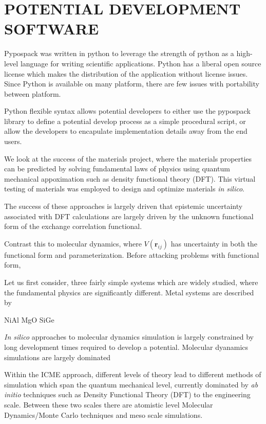 \chapter{POTENTIAL DEVELOPMENT SOFTWARE}

Pypospack was written in python to leverage the strength of python as a high-level language for writing scientific applications.  Python has a liberal open source license which makes the distribution of the application without license issues.  Since Python is available on many platform, there are few issues with portability between platform.

Python flexible syntax allows potential developers to either use the pypospack library to define a potential develop process as a simple procedural script, or allow the developers to encapulate implementation details away from the end users.

We look at the success of the materials project, where the materials properties can be predicted by solving fundamental laws of physics using quantum mechanical appoximation such as density functional theory (DFT).  This virtual testing of materials was employed to design and optimize materials \emph{in silico}.

The success of these approaches is largely driven that epistemic uncertainty associated with DFT calculations are largely driven by the unknown functional form of the exchange correlation functional.

Contrast this to molecular dynamics, where $V(\bm{r}_{ij})$ has uncertainty in both the functional form and parameterization.  Before attacking problems with functional form,

Let us first consider, three fairly simple systems which are widely studied, where the fundamental physics are significantly different.  Metal systems are described by

NiAl
MgO
SiGe

\emph{In silico} approaches to molecular dynamics simulation is largely constrained by long development times required to develop a potential.  Molecular dyanamics simulations are largely dominated

Within the ICME approach, different levels of theory lead to different methods of simulation which span the quantum mechanical level, currently dominated by \emph{ab initio} techniques such as Density Functional Theory (DFT) to the engineering scale.  Between these two scales there are atomistic level Molecular Dynamics/Monte Carlo techniques and meso scale simulations.

